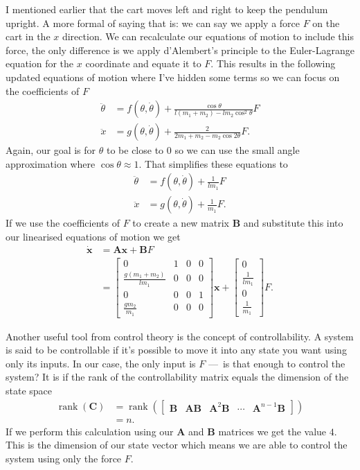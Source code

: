\documentclass{article}
\DeclareMathOperator{\rank}{rank}
\renewcommand{\vec}[1]{\boldsymbol{\mathbf{#1}}}
\newcommand{\dvec}[1]{\dot{\vec{#1}}}
\begin{document}
I mentioned earlier that the cart moves left and right to keep the pendulum upright. A more formal of saying that is: we can say we apply a force $F$ on the cart in the $x$ direction. We can recalculate our equations of motion to include this force, the only difference is we apply d'Alembert's principle to the Euler-Lagrange equation for the $x$ coordinate and equate it to $F$. This results in the following updated equations of motion where I've hidden some terms so we can focus on the coefficients of $F$ \begin{align*}
  \ddot{\theta} & = f(\theta, \dot{\theta}) + \frac{\cos \theta}{l (m_1 + m_2) - l m_2 \cos^2 \theta} F \\
  \ddot{x}      & = g(\theta, \dot{\theta}) + \frac{2}{2 m_1 + m_2 - m_2 \cos 2 \theta} F.
\end{align*} Again, our goal is for $\theta$ to be close to $0$ so we can use the small angle approximation where $\cos \theta \approx 1$. That simplifies these equations to \begin{align*}
  \ddot{\theta} & = f(\theta, \dot{\theta}) + \frac{1}{l m_1} F \\
  \ddot{x}      & = g(\theta, \dot{\theta}) + \frac{1}{m_1} F.
\end{align*} If we use the coefficients of $F$ to create a new matrix $\vec{B}$ and substitute this into our linearised equations of motion we get \begin{align*}
\dvec{x} &= \vec{A} \vec{x} + \vec{B} F \\
&= \begin{bmatrix}
    0                           & 1 & 0 & 0 \\
    \frac{g (m_1 + m_2)}{l m_1} & 0 & 0 & 0 \\
    0                           & 0 & 0 & 1 \\
    \frac{g m_2}{m_1}           & 0 & 0 & 0
  \end{bmatrix} \vec{x} + \begin{bmatrix}
    0               \\
    \frac{1}{l m_1} \\
    0               \\
    \frac{1}{m_1}
\end{bmatrix} F.
\end{align*}

Another useful tool from control theory is the concept of controllability. A system is said to be controllable if it's possible to move it into any state you want using only its inputs. In our case, the only input is $F$ — is that enough to control the system? It is if the rank of the controllability matrix equals the dimension of the state space \begin{align*}
\rank(\vec{C}) &= \rank(\begin{bmatrix}
\vec{B} & \vec{A} \vec{B} & \vec{A}^2 \vec{B} & \cdots & \vec{A}^{n - 1} \vec{B}
\end{bmatrix}) \\
&= n.
\end{align*} If we perform this calculation using our $\vec{A}$ and $\vec{B}$ matrices we get the value $4$. This is the dimension of our state vector which means we are able to control the system using only the force $F$.
\end{document}
